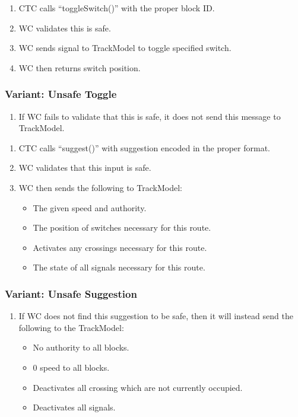 \documentclass{scrreprt}
\begin{document}
    \begin{enumerate}
        \item CTC calls ``toggleSwitch()'' with the proper block ID.
        \item WC validates this is safe.
        \item WC sends signal to TrackModel to toggle specified switch.
        \item WC then returns switch position.
    \end{enumerate}
    \subsubsection{Variant: Unsafe Toggle}
    \begin{enumerate}[label=3\alph*.]
        \item If WC fails to validate that this is safe, it does not send this message to TrackModel.
    \end{enumerate}

    \begin{enumerate}
        \item CTC calls ``suggest()'' with suggestion encoded in the proper format.
        \item WC validates that this input is safe.
        \item WC then sends the following to TrackModel:
            \begin{itemize}
                \item The given speed and authority.
                \item The position of switches necessary for this route.
                \item Activates any crossings necessary for this route.
                \item The state of all signals necessary for this route.
            \end{itemize}
    \end{enumerate}

    \subsubsection{Variant: Unsafe Suggestion}
    \begin{enumerate}[label=\arabic*a., start=3]
        \item If WC does not find this suggestion to be safe, then it will instead send the following to the TrackModel:
            \begin{itemize}
                \item No authority to all blocks.
                \item 0 speed to all blocks.
                \item Deactivates all crossing which are not currently occupied.
                \item Deactivates all signals.
            \end{itemize}
    \end{enumerate}
\end{document}
